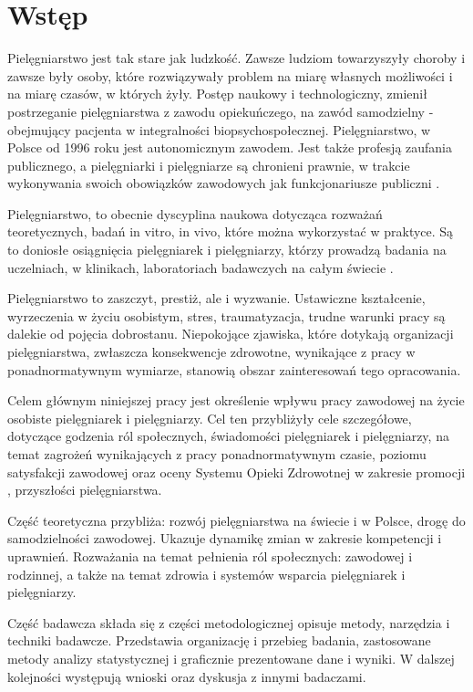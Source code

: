 \documentclass[a4paper,12pt,twoside,openright]{mwrep}
\begin{document}

\chapter*{Wstęp}

Pielęgniarstwo jest tak stare jak ludzkość. Zawsze ludziom towarzyszyły choroby i zawsze były osoby, które rozwiązywały problem na miarę własnych możliwości i na miarę czasów, w których żyły. Postęp naukowy i technologiczny, zmienił postrzeganie pielęgniarstwa z zawodu opiekuńczego, na zawód samodzielny - obejmujący pacjenta w integralności biopsychospołecznej. Pielęgniarstwo, w Polsce od 1996 roku jest autonomicznym zawodem\cite{konst97art17}. Jest także profesją zaufania publicznego, a pielęgniarki i pielęgniarze są chronieni prawnie, w trakcie wykonywania swoich obowiązków zawodowych jak funkcjonariusze publiczni \cite{art4uozp}.

Pielęgniarstwo, to obecnie dyscyplina naukowa dotycząca rozważań teoretycznych, badań in vitro, in vivo, które można wykorzystać w praktyce. Są to doniosłe osiągnięcia pielęgniarek i pielęgniarzy, którzy prowadzą badania na uczelniach, w klinikach, laboratoriach badawczych na całym świecie \cite{nursingresearch}.

Pielęgniarstwo to zaszczyt, prestiż, ale i wyzwanie. Ustawiczne kształcenie, wyrzeczenia w życiu osobistym, stres, traumatyzacja, trudne warunki pracy są dalekie od pojęcia dobrostanu.  Niepokojące zjawiska, które dotykają organizacji pielęgniarstwa, zwłaszcza konsekwencje zdrowotne, wynikające z pracy w ponadnormatywnym wymiarze, stanowią obszar zainteresowań tego opracowania.

Celem głównym niniejszej pracy jest określenie wpływu pracy zawodowej na życie osobiste pielęgniarek i pielęgniarzy. Cel ten przybliżyły cele szczegółowe, dotyczące godzenia ról społecznych, świadomości pielęgniarek i pielęgniarzy, na temat zagrożeń wynikających z pracy ponadnormatywnym czasie, poziomu satysfakcji zawodowej oraz oceny Systemu Opieki Zdrowotnej w zakresie promocji , przyszłości pielęgniarstwa.

Część teoretyczna przybliża: rozwój pielęgniarstwa na świecie i w Polsce, drogę do samodzielności zawodowej. Ukazuje dynamikę zmian w zakresie kompetencji i uprawnień. Rozważania na temat pełnienia ról społecznych: zawodowej i rodzinnej, a także na temat zdrowia i systemów wsparcia pielęgniarek i pielęgniarzy. 

Część badawcza składa się z części metodologicznej opisuje metody, narzędzia i techniki badawcze. Przedstawia organizację i przebieg badania, zastosowane metody analizy statystycznej i graficznie prezentowane dane i wyniki. W dalszej kolejności występują wnioski oraz dyskusja z innymi badaczami.
\end{document}
